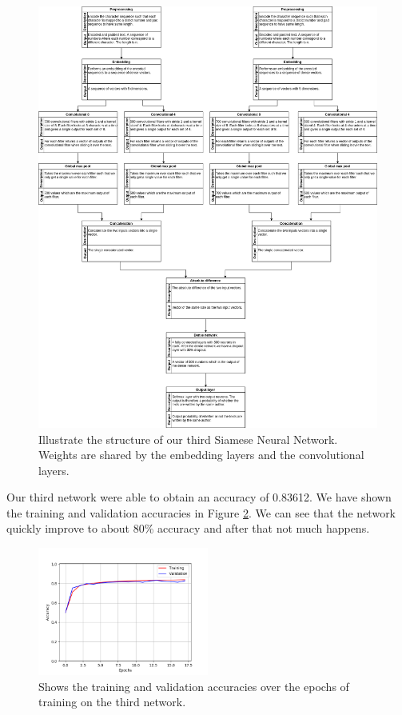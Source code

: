 \begin{figure}
    \centering
    \includegraphics[width=\textwidth]{./pictures/experiments/network3.png}
    \caption{Illustrate the structure of our third Siamese Neural Network.
        Weights are shared by the embedding layers and the convolutional
        layers.}
    \label{fig:network3}
\end{figure}

Our third network were able to obtain an accuracy of 0.83612. We have shown the
training and validation accuracies in Figure \ref{fig:network_3_accuracies}. We
can see that the network quickly improve to about 80\% accuracy and after that
not much happens.

\begin{figure}
    \centering
    \includegraphics[width=0.5\textwidth]{./pictures/experiments/network_3_accuracies.png}
    \caption{Shows the training and validation accuracies over the epochs of
        training on the third network.}
    \label{fig:network_3_accuracies}
\end{figure}

